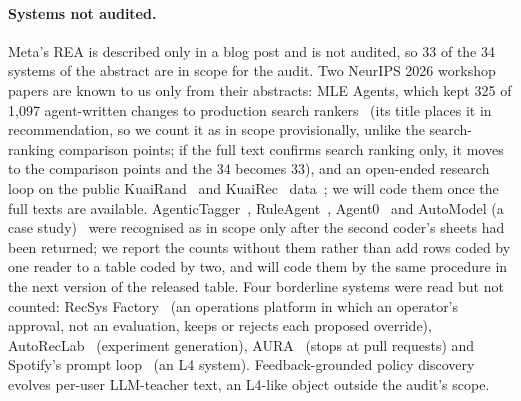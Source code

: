 \documentclass[sigconf,nonacm]{acmart}
\begin{document}
\paragraph{Systems not audited.} Meta's REA is described only in a blog post and is not audited, so 33 of the 34 systems of the abstract are in scope for the audit. Two NeurIPS
2026 workshop papers are known to us only from their abstracts: MLE Agents, which kept 325 of 1{,}097 agent-written
changes to production search rankers~\cite{li2026mleagents} (its title places it in recommendation, so we count it as in scope provisionally, unlike the search-ranking comparison points; if the full text confirms search ranking only, it moves to the comparison points and the 34 becomes 33), and an open-ended research loop on the public
KuaiRand~\cite{gao2022kuairand} and KuaiRec~\cite{gao2022kuairec} data~\cite{chen2026openended}; we will code them once
the full texts are available. AgenticTagger~\cite{xie2026agentictagger}, RuleAgent~\cite{wang2025ruleagent}, Agent0~\cite{skrlj2025agent0}
and AutoModel (a case study)~\cite{zhang2026agenticrs} were recognised as in scope only after the second coder's sheets had been returned; we report the counts without them rather than add rows coded by one reader to a table coded by two, and will code them by the same procedure in the next version of the released table. Four borderline systems were read but not counted: RecSys
Factory~\cite{ao2026recsysfactory} (an operations platform in which an operator's approval, not an evaluation, keeps or
rejects each proposed override), AutoRecLab~\cite{baumgart2026autoreclab} (experiment generation),
AURA~\cite{kim2026aura} (stops at pull requests) and Spotify's prompt loop~\cite{palumbo2026spotify} (an L4 system).
Feedback-grounded policy discovery~\cite{chen2026policydiscovery} evolves per-user LLM-teacher text, an L4-like object outside the audit's scope.
\end{document}
